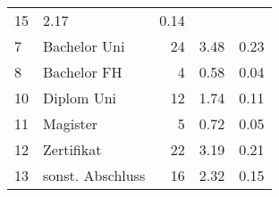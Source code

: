 \begin{longtable}{lXrrr}
       \num{15} &
       \num[round-mode=places,round-precision=2]{2.17} &
         \num[round-mode=places,round-precision=2]{0.14} \\

     7 &
     \multicolumn{1}{X}{ Bachelor Uni   } &


       \num{24} &
       \num[round-mode=places,round-precision=2]{3.48} &
         \num[round-mode=places,round-precision=2]{0.23} \\

     8 &
     \multicolumn{1}{X}{ Bachelor FH   } &


       \num{4} &
       \num[round-mode=places,round-precision=2]{0.58} &
         \num[round-mode=places,round-precision=2]{0.04} \\

     10 &
     \multicolumn{1}{X}{ Diplom Uni   } &


       \num{12} &
       \num[round-mode=places,round-precision=2]{1.74} &
         \num[round-mode=places,round-precision=2]{0.11} \\

     11 &
     \multicolumn{1}{X}{ Magister   } &


       \num{5} &
       \num[round-mode=places,round-precision=2]{0.72} &
         \num[round-mode=places,round-precision=2]{0.05} \\

     12 &
     \multicolumn{1}{X}{ Zertifikat   } &


       \num{22} &
       \num[round-mode=places,round-precision=2]{3.19} &
         \num[round-mode=places,round-precision=2]{0.21} \\

     13 &
     \multicolumn{1}{X}{ sonst. Abschluss   } &


       \num{16} &
       \num[round-mode=places,round-precision=2]{2.32} &
         \num[round-mode=places,round-precision=2]{0.15} \\


\end{longtable}
